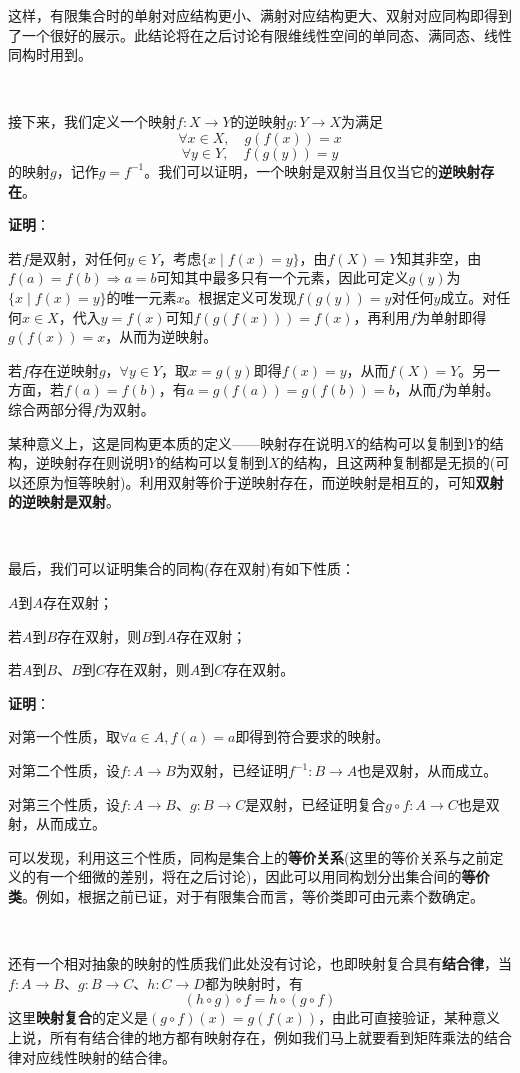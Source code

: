 \documentclass[a4paper,UTF8,fontset=windows,AutoFakeBold]{ctexart}
\newcommand*{\note}{\noindent *}
\newcommand{\proo}[1]{{\vspace{5pt}\kaishu\noindent\textbf{证明}：\vspace{-3pt}
\begin{compactitem}
    \item[] #1
\end{compactitem}
}}
\begin{document}
这样，有限集合时的单射对应结构更小、满射对应结构更大、双射对应同构即得到了一个很好的展示。此结论将在之后讨论有限维线性空间的单同态、满同态、线性同构时用到。

\

接下来，我们定义一个映射$f:X\to Y$的逆映射$g:Y\to X$为满足
$$\forall x\in X,\quad g(f(x))=x$$
$$\forall y\in Y,\quad f(g(y))=y$$
的映射$g$，记作$g=f^{-1}$。我们可以证明，一个映射是双射当且仅当它的\textbf{逆映射存在}。

\proo{
    若$f$是双射，对任何$y\in Y$，考虑$\{x\mid f(x)=y\}$，由$f(X)=Y$知其非空，由$f(a)=f(b)\Rightarrow a=b$可知其中最多只有一个元素，因此可定义$g(y)$为$\{x\mid f(x)=y\}$的唯一元素$x$。根据定义可发现$f(g(y))=y$对任何$y$成立。对任何$x\in X$，代入$y=f(x)$可知$f(g(f(x)))=f(x)$，再利用$f$为单射即得$g(f(x))=x$，从而为逆映射。

    若$f$存在逆映射$g$，$\forall y\in Y$，取$x=g(y)$即得$f(x)=y$，从而$f(X)=Y$。另一方面，若$f(a)=f(b)$，有$a=g(f(a))=g(f(b))=b$，从而$f$为单射。综合两部分得$f$为双射。
}

\note 某种意义上，这是同构更本质的定义——映射存在说明$X$的结构可以复制到$Y$的结构，逆映射存在则说明$Y$的结构可以复制到$X$的结构，且这两种复制都是无损的(可以还原为恒等映射)。利用双射等价于逆映射存在，而逆映射是相互的，可知\textbf{双射的逆映射是双射}。

\

最后，我们可以证明集合的同构(存在双射)有如下性质：
\begin{compactitem}
    \item $A$到$A$存在双射；
    \item 若$A$到$B$存在双射，则$B$到$A$存在双射；
    \item 若$A$到$B$、$B$到$C$存在双射，则$A$到$C$存在双射。
\end{compactitem}

\proo{
    对第一个性质，取$\forall a\in A,f(a)=a$即得到符合要求的映射。

    对第二个性质，设$f:A\to B$为双射，已经证明$f^{-1}:B\to A$也是双射，从而成立。

    对第三个性质，设$f:A\to B$、$g:B\to C$是双射，已经证明复合$g\circ f:A\to C$也是双射，从而成立。
}

可以发现，利用这三个性质，同构是集合上的\textbf{等价关系}(这里的等价关系与之前定义的有一个细微的差别，将在之后讨论)，因此可以用同构划分出集合间的\textbf{等价类}。例如，根据之前已证，对于有限集合而言，等价类即可由元素个数确定。

\

\note 还有一个相对抽象的映射的性质我们此处没有讨论，也即映射复合具有\textbf{结合律}，当$f:A\to B$、$g:B\to C$、$h:C\to D$都为映射时，有
$$(h\circ g)\circ f=h\circ (g\circ f)$$
这里\textbf{映射复合}的定义是$(g\circ f)(x)=g(f(x))$，由此可直接验证，某种意义上说，所有有结合律的地方都有映射存在，例如我们马上就要看到矩阵乘法的结合律对应线性映射的结合律。
\end{document}
